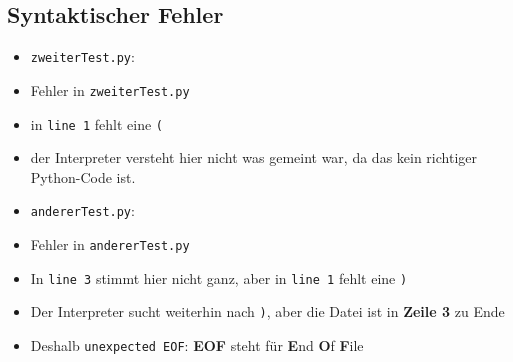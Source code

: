 \subsection{Syntaktischer Fehler}

\begin{frame}
	\slidehead
	\begin{itemize}
		\item \texttt{zweiterTest.py}:
		\pause
		\pause
		\item Fehler in \texttt{zweiterTest.py}
		\pause
		\item in \texttt{line 1} fehlt eine \texttt{(}
		\item der Interpreter versteht hier nicht was gemeint war, da das kein richtiger Python-Code ist.
	\end{itemize}
\end{frame}

\begin{frame}
	\slidehead
	\begin{itemize}
		\item \texttt{andererTest.py}:
		\pause
		\pause
		\item Fehler in \texttt{andererTest.py}
		\pause
		\item In \texttt{line 3} stimmt hier nicht ganz, aber in \texttt{line 1} fehlt eine \texttt{)}
		\pause
		\item Der Interpreter sucht weiterhin nach \texttt{)}, aber die Datei ist in \textbf{Zeile 3} zu Ende
		\pause
		\item Deshalb \texttt{unexpected EOF}: \textbf{EOF} steht für \textbf{E}nd \textbf{O}f \textbf{F}ile
	\end{itemize}
\end{frame}

\subsection{}
\livecoding



